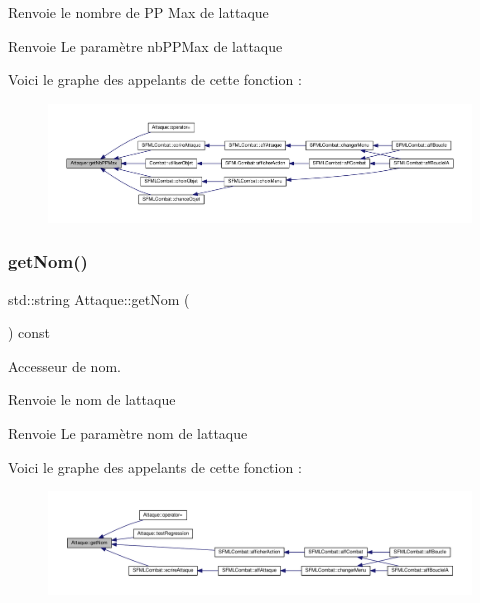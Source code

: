Renvoie le nombre de PP Max de l\textquotesingle{}attaque \begin{DoxyReturn}{Renvoie}
Le paramètre nb\+P\+P\+Max de l\textquotesingle{}attaque 
\end{DoxyReturn}
Voici le graphe des appelants de cette fonction \+:\nopagebreak
\begin{figure}[H]
\begin{center}
\leavevmode
\includegraphics[width=350pt]{class_attaque_a651deeca5e47dd04929bd1c9d013c86e_icgraph}
\end{center}
\end{figure}
\mbox{\label{class_attaque_a2d3e865f856f681f79934680b25ac372}} 
\subsubsection{\texorpdfstring{get\+Nom()}{getNom()}}
{\footnotesize\ttfamily std\+::string Attaque\+::get\+Nom (\begin{DoxyParamCaption}{ }\end{DoxyParamCaption}) const}



Accesseur de nom. 

Renvoie le nom de l\textquotesingle{}attaque \begin{DoxyReturn}{Renvoie}
Le paramètre nom de l\textquotesingle{}attaque 
\end{DoxyReturn}
Voici le graphe des appelants de cette fonction \+:\nopagebreak
\begin{figure}[H]
\begin{center}
\leavevmode
\includegraphics[width=350pt]{class_attaque_a2d3e865f856f681f79934680b25ac372_icgraph}
\end{center}
\end{figure}
\mbox{\label{class_attaque_ada8c22f0becc001b46e6a7f2da00a1ef}} 
